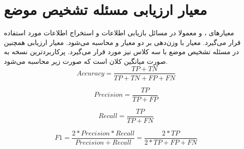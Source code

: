 \section{معیار ارزیابی مسئله تشخیص موضع}
معیارهای
، 
و 
معمولا در مسائل بازیابی اطلاعات
و استخراج اطلاعات
مورد استفاده قرار می‌گیرد. معیار
 با وزن‌دهی بر دو معیار
 و
  محاسبه می‌شود. معیار ارزیابی
همچنین در مسئله تشخیص موضع با سه کلاس نیز مورد قرار می‌گیرد. پرکاربردترین نسخه
 به صورت میانگین کلان
است که صورت زیر محاسبه می‌شود.
 \begin{equation}
	Accuracy = \frac{TP+TN}{TP+TN+FP+FN}
\end{equation}
 
\begin{equation}
 	Precision = \frac{TP}{TP+FP}
\end{equation}

\begin{equation}
	Recall = \frac{TP}{TP+FN}
\end{equation}

\begin{equation}
	F1 = \frac{2*Precision*Recall}{Precision+Recall} = \frac{2*TP}{2*TP+FP+FN}
\end{equation}


